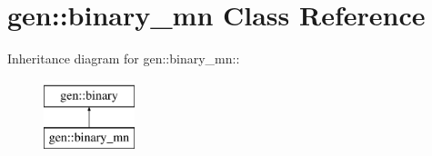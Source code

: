 \hypertarget{classgen_1_1binary__mn}{
\section{gen::binary\_\-mn Class Reference}
\label{classgen_1_1binary__mn}
}
Inheritance diagram for gen::binary\_\-mn::\begin{figure}[H]
\begin{center}
\leavevmode
\includegraphics[height=2cm]{classgen_1_1binary__mn}
\end{center}
\end{figure}
